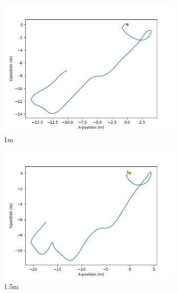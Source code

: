 \documentclass[class=article, crop=false]{standalone}
\begin{document}
\begin{figure}
\begin{subfigure}[b]{0.48\textwidth}
        \includegraphics{scenario1/rov-100m/1.0m/usv_position_controlled}
        \caption{1m}
        \label{}
    \end{subfigure}
    \hfill
    \begin{subfigure}[b]{0.48\textwidth}
        \centering
        \includegraphics{scenario1/rov-100m/1.5m/usv_position_controlled}
        \caption{1.5m}
        \label{}
    \end{subfigure}
    \vfill
    \begin{subfigure}[b]{0.48\textwidth}
        \centering

\end{subfigure}
\end{figure}
\end{document}
